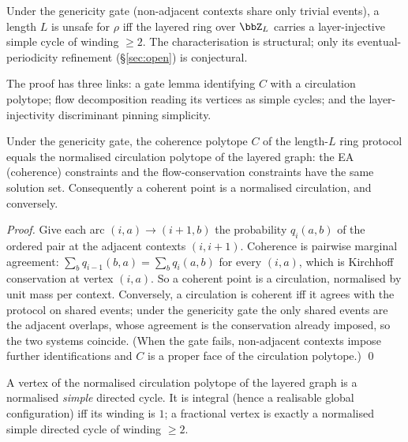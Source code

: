 \begin{theorem}\label{thm:winding}
Under the genericity gate (non-adjacent contexts share only trivial events), a
length $L$ is unsafe for $\rho$ iff the layered ring over $\bbZ_L$ carries a
layer-injective simple cycle of winding $\ge 2$. The characterisation is
structural; only its eventual-periodicity refinement (\S\ref{sec:open}) is
conjectural.
\end{theorem}

The proof has three links: a gate lemma identifying $C$ with a circulation
polytope; flow decomposition reading its vertices as simple cycles; and the
layer-injectivity discriminant pinning simplicity.

\begin{lemma}\label{lem:gate}
Under the genericity gate, the coherence polytope $C$ of the length-$L$ ring
protocol equals the normalised circulation polytope of the layered graph: the EA
(coherence) constraints and the flow-conservation constraints have the same
solution set. Consequently a coherent point is a normalised circulation, and
conversely.
\end{lemma}

\begin{proof}
Give each arc $(i,a)\to(i{+}1,b)$ the probability $q_i(a,b)$ of the ordered pair
at the adjacent contexts $(i,i{+}1)$. Coherence is pairwise marginal agreement:
$\sum_b q_{i-1}(b,a)=\sum_b q_i(a,b)$ for every $(i,a)$, which is Kirchhoff
conservation at vertex $(i,a)$. So a coherent point is a circulation, normalised by
unit mass per context. Conversely, a circulation is coherent iff it agrees with the
protocol on shared events; under the genericity gate the only shared events are the
adjacent overlaps, whose agreement is the conservation already imposed, so the two
systems coincide. (When the gate fails, non-adjacent contexts impose further
identifications and $C$ is a proper face of the circulation polytope.) \qed
\end{proof}

\begin{lemma}\label{lem:flowdecomp}
A vertex of the normalised circulation polytope of the layered graph is a
normalised \emph{simple} directed cycle. It is integral (hence a realisable
global configuration) iff its winding is $1$; a fractional vertex is exactly a
normalised simple directed cycle of winding $\ge 2$.
\end{lemma}

